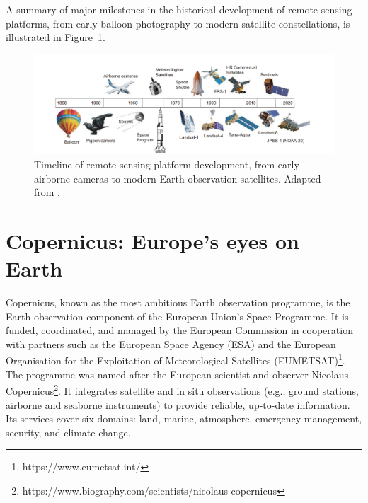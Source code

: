 A summary of major milestones in the historical development of remote sensing platforms, from early balloon photography to modern satellite constellations, is illustrated in Figure~\ref{fig:RS_timeline}.

\begin{figure}[H]
  \centering
  \includegraphics[width=\textwidth]{img/RS_timeline.png}
  \caption[Timeline of remote sensing platform development]{Timeline of remote sensing platform development, from early airborne cameras to modern Earth observation satellites. Adapted from \cite{book_Satellite_RS}.}
  \label{fig:RS_timeline}
\end{figure}

\section{Copernicus: Europe's eyes on Earth}
Copernicus, known as the most ambitious Earth observation programme, is the Earth observation component of the European Union's Space Programme.
It is funded, coordinated, and managed by the European Commission in cooperation with partners such as the European Space Agency (ESA) and the European Organisation for the Exploitation of Meteorological Satellites (EUMETSAT)\footnote{https://www.eumetsat.int/}. The programme was named after the European scientist and observer Nicolaus Copernicus\footnote{https://www.biography.com/scientists/nicolaus-copernicus}. It integrates satellite and in situ observations (e.g., ground stations, airborne and seaborne instruments) to provide reliable, up-to-date information. Its services cover six domains: land, marine, atmosphere, emergency management, security, and climate change. 

